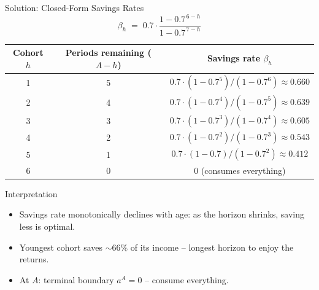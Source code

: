 \documentclass[aspectratio=169,11pt]{beamer}
\newcommand{\emphc}[1]{\textcolor{harvardcrimson}{#1}}
\begin{document}
\begin{frame}{\emphc{Solution:} Closed-Form Savings Rates}
\footnotesize
\[
\beta_h \;=\; 0.7 \cdot \frac{1 - 0.7^{\,6-h}}{1 - 0.7^{\,7-h}}
\]

\vspace{-0.1em}
\begin{center}\renewcommand{\arraystretch}{0.95}
\begin{tabular}{ccc}
\toprule
Cohort $h$ & Periods remaining ($A-h$) & Savings rate $\beta_h$\\
\midrule
1 & 5 & $0.7\cdot(1-0.7^5)/(1-0.7^6) \approx 0.660$ \\
2 & 4 & $0.7\cdot(1-0.7^4)/(1-0.7^5) \approx 0.639$ \\
3 & 3 & $0.7\cdot(1-0.7^3)/(1-0.7^4) \approx 0.605$ \\
4 & 2 & $0.7\cdot(1-0.7^2)/(1-0.7^3) \approx 0.543$ \\
5 & 1 & $0.7\cdot(1-0.7)/(1-0.7^2) \approx 0.412$ \\
6 & 0 & $0$ (consumes everything)\\
\bottomrule
\end{tabular}\end{center}

\vspace{-0.1em}
\begin{block}{Interpretation}
\vspace{-3pt}\begin{itemize}\itemsep0pt
    \item Savings rate \emphc{monotonically declines} with age: as the horizon shrinks, saving less is optimal.
    \item Youngest cohort saves \emphc{$\sim 66\%$} of its income -- longest horizon to enjoy the returns.
    \item At $A$: terminal boundary $a^A = 0$ -- consume everything.
\end{itemize}
\end{block}
\end{frame}
\end{document}
